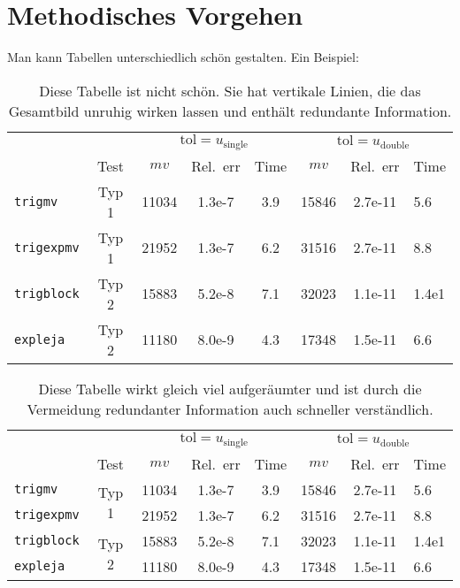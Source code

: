 \chapter{Methodisches Vorgehen}\label{ch:methodisches_vorgehen}
Man kann Tabellen unterschiedlich schön gestalten. Ein Beispiel:
\begin{table}[hbtp]
	\centering
	\caption[Unschöne Tabelle]{Diese Tabelle ist nicht schön. Sie hat vertikale Linien, die das Gesamtbild unruhig wirken lassen und enthält redundante Information.}
	\label{tab:unschoen}
	\begin{tabular}{|l|c|c|c|c|c|c|l|}\hline
		&& \multicolumn{3}{c|}{\(\text{tol}= u_{\text{single}}\)} & \multicolumn{3}{c|}{\(\text{tol}= u_{\text{double}}\)}\\
		&Test& $mv$  & Rel.~err & Time    & $mv$  & Rel.~err & Time   \\\hline
		\texttt{trigmv}   & Typ 1 & 11034 & 1.3e-7 & 3.9 & 15846 & 2.7e-11 & 5.6 \\
		\texttt{trigexpmv}& Typ 1  & 21952 & 1.3e-7 & 6.2 & 31516 & 2.7e-11 & 8.8 \\
		\texttt{trigblock}& Typ 2  & 15883 & 5.2e-8 & 7.1 & 32023 & 1.1e-11 & 1.4e1\\
		\texttt{expleja}  & Typ 2  & 11180 & 8.0e-9 & 4.3 & 17348 & 1.5e-11 & 6.6 \\\hline
	\end{tabular}
\end{table}


\begin{table}[hbtp]
	\centering
	\caption[Schöne Tabelle]{Diese Tabelle wirkt gleich viel aufgeräumter und ist durch die Vermeidung redundanter Information auch schneller verständlich.}
	\label{tab:schoen}
	\begin{tabular}{lccccccl}\hline
	&& \multicolumn{3}{c}{\(\text{tol}= u_{\text{single}}\)} & \multicolumn{3}{c}{\(\text{tol}= u_{\text{double}}\)} 
	\\\cmidrule(lr){3-5}\cmidrule(lr){6-8}
	&Test & $mv$  & Rel.~err & Time    & $mv$  & Rel.~err & Time\\\midrule
	\texttt{trigmv}   &\multirow{2}{*}{Typ 1} & 11034 & 1.3e-7 & 3.9 & 15846 & 2.7e-11 & 5.6 \\
	\texttt{trigexpmv}& & 21952 & 1.3e-7 & 6.2 & 31516 & 2.7e-11 & 8.8 \\
	\texttt{trigblock}&\multirow{2}{*}{Typ 2} & 15883 & 5.2e-8 & 7.1 & 32023 & 1.1e-11 & 1.4e1\\
	\texttt{expleja}  & & 11180 & 8.0e-9 & 4.3 & 17348 & 1.5e-11 & 6.6 \\\bottomrule
	\end{tabular}
\end{table}